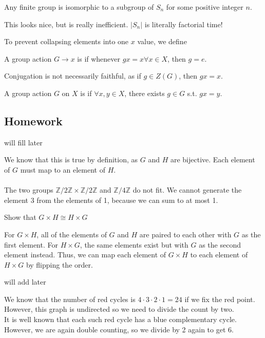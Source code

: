 \documentclass{scrartcl}
\begin{document}
\begin{theorem} 
	Any finite group is isomorphic to a subgroup of $S_n$ for some positive integer $n$.
\end{theorem}
This looks nice, but is really inefficient. $|S_n|$ is literally factorial time!

To prevent collapsing elements into one $x$ value, we define
\begin{definition} 
	A group action $G \rightarrow x$ is  if whenever $gx = x \forall x \in X$, then $g = e$.
\end{definition}
Conjugation is not necessarily faithful, as if $g \in Z(G)$, then $gx = x$.

\begin{definition}
	A group action $G$ on $X$ is  if $\forall x,y \in X$, there exists $g \in G$ s.t. $gx=y$.
\end{definition}

\subsection{Homework}
\begin{problem}
	will fill later
\end{problem}

\begin{solution}
	We know that this is true by definition, as $G$ and $H$ are bijective. Each element of $G$ must map to an element of $H$. \\ \\
	The two groups $\mathbb{Z} / 2\mathbb{Z} \times \mathbb{Z} / 2\mathbb{Z}$ and $\mathbb{Z} / 4\mathbb{Z}$ do not fit. We cannot generate the element $3$ from the elements of 1, because we can sum to at most 1.
\end{solution}

\begin{problem}
	Show that $G \times H \cong H \times G$
\end{problem}

\begin{solution}
	For $G \times H$, all of the elements of $G$ and $H$ are paired to each other with $G$ as the first element. For $H \times G$, the same elements exist but with $G$ as the second element instead. Thus, we can map each element of $G \times H$ to each element of $H \times G$ by flipping the order.
\end{solution}

\begin{problem}
	will add later
\end{problem}

\begin{solution}
	We know that the number of red cycles is $4 \cdot 3 \cdot 2 \cdot 1 = 24$ if we fix the red point. However, this graph is undirected so we need to divide the count by two. \\
	It is well known that each such red cycle has a blue complementary cycle. However, we are again double counting, so we divide by 2 again to get 6.
\end{solution}
\end{document}
